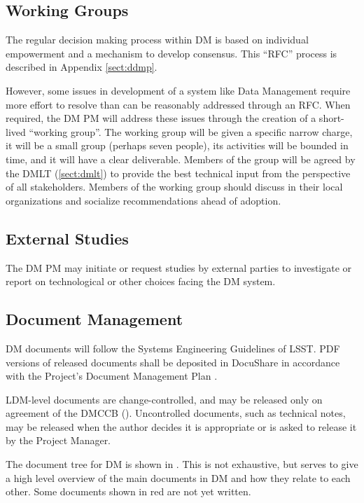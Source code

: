 \subsection {Working Groups} \label{sect:wgs}

The regular decision making process within DM is based on individual empowerment and a mechanism to develop consensus.
This ``RFC'' process is described in Appendix \ref{sect:ddmp}.

However, some issues in development of a system like Data Management require more effort to resolve than can be reasonably addressed through an RFC.
When required, the DM PM will address these issues through the creation of a short-lived ``working group''.
The working group will be given a specific narrow charge, it will be a small group (perhaps seven people), its activities will be bounded in time, and it will have a clear deliverable.
Members of the group will be agreed by the DMLT (\ref{sect:dmlt}) to provide the best technical input from the perspective of all stakeholders.
Members of the working group should discuss in their local organizations and socialize recommendations ahead of adoption.

\subsection {External Studies} \label{sect:studies}

The DM PM may initiate or request studies by external parties to investigate or report on technological or other choices facing the DM system.


\subsection {Document Management} \label{sect:docman}

DM documents will follow the Systems Engineering Guidelines of LSST. PDF versions of released documents shall be deposited in DocuShare in accordance with the Project's Document Management Plan .

LDM-level documents are change-controlled, and may be released only on agreement of the DMCCB (). Uncontrolled documents, such as technical notes, may be released when the author decides it is appropriate or is asked to release it by the Project Manager.

The document tree for DM is shown in . This is not exhaustive, but serves to give a high level overview of the main documents in DM and how they relate to each other. Some documents shown in red are not yet written.

